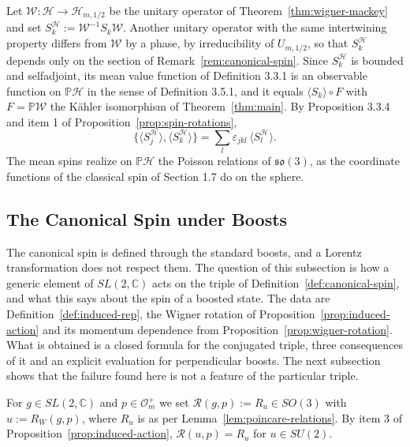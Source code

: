 \begin{remark}\label{rem:spin-state-space}
	Let $\mathcal{W}:\mathcal{H}\to\mathcal{H}_{m,1/2}$ be the unitary operator of Theorem~\ref{thm:wigner-mackey} and set $S_k^{\mathcal{H}}:=\mathcal{W}^{-1}S_k\mathcal{W}$. Another unitary operator with the same intertwining property differs from $\mathcal{W}$ by a phase, by irreducibility of $U_{m,1/2}$, so that $S_k^{\mathcal{H}}$ depends only on the section of Remark~\ref{rem:canonical-spin}. Since $S_k^{\mathcal{H}}$ is bounded and selfadjoint, its mean value function of Definition 3.3.1 is an observable function on $\mathbb{P}\mathcal{H}$ in the sense of Definition 3.5.1, and it equals $\langle S_k\rangle\circ F$ with $F=\mathbb{P}\mathcal{W}$ the Kähler isomorphism of Theorem~\ref{thm:main}. By Proposition 3.3.4 and item 1 of Proposition~\ref{prop:spin-rotations},
	\begin{equation*}
		\big\{\langle S_j^{\mathcal{H}}\rangle,\langle S_k^{\mathcal{H}}\rangle\big\}=\sum_l\varepsilon_{jkl}\,\langle S_l^{\mathcal{H}}\rangle.
	\end{equation*}
	The mean spins realize on $\mathbb{P}\mathcal{H}$ the Poisson relations of $\mathfrak{so}(3)$, as the coordinate functions of the classical spin of Section 1.7 do on the sphere.
\end{remark}

\subsection{The Canonical Spin under Boosts}
\label{subsec:spin-boosts}

The canonical spin is defined through the standard boosts, and a Lorentz transformation does not respect them. The question of this subsection is how a generic element of $SL(2,\mathbb{C})$ acts on the triple of Definition~\ref{def:canonical-spin}, and what this says about the spin of a boosted state. The data are Definition~\ref{def:induced-rep}, the Wigner rotation of Proposition~\ref{prop:induced-action} and its momentum dependence from Proposition~\ref{prop:wigner-rotation}. What is obtained is a closed formula for the conjugated triple, three consequences of it and an explicit evaluation for perpendicular boosts. The next subsection shows that the failure found here is not a feature of the particular triple.

For $g\in SL(2,\mathbb{C})$ and $p\in\mathcal{O}_m^+$ we set $\mathcal{R}(g,p):=R_u\in SO(3)$ with $u:=R_W(g,p)$, where $R_u$ is as per Lemma~\ref{lem:poincare-relations}. By item 3 of Proposition~\ref{prop:induced-action}, $\mathcal{R}(u,p)=R_u$ for $u\in SU(2)$.

